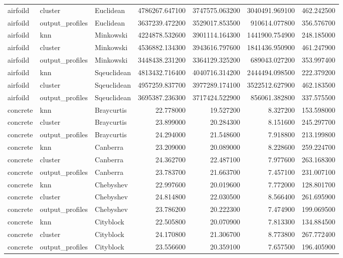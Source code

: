 \begin{tabular}{lllrrrr}
airfoild & cluster & Euclidean & 4786267.647100 & 3747575.063200 & 3040491.969100 & 462.242500 \\
airfoild & output\_profiles & Euclidean & 3637239.472200 & 3529017.853500 & 910614.077800 & 356.576700 \\
airfoild & knn & Minkowski & 4224878.532600 & 3901114.164300 & 1441900.754900 & 248.185000 \\
airfoild & cluster & Minkowski & 4536882.134300 & 3943616.797600 & 1841436.950900 & 461.247900 \\
airfoild & output\_profiles & Minkowski & 3448438.231200 & 3364129.325200 & 689043.027200 & 353.997400 \\
airfoild & knn & Sqeuclidean & 4813432.716400 & 4040716.314200 & 2444494.098500 & 222.379200 \\
airfoild & cluster & Sqeuclidean & 4957259.837700 & 3977289.174100 & 3522512.627900 & 462.183500 \\
airfoild & output\_profiles & Sqeuclidean & 3695387.236300 & 3717424.522900 & 856061.382800 & 337.575500 \\
concrete & knn & Braycurtis & 22.778000 & 19.527200 & 8.327200 & 153.598000 \\
concrete & cluster & Braycurtis & 23.899000 & 20.284300 & 8.151600 & 245.297700 \\
concrete & output\_profiles & Braycurtis & 24.294000 & 21.548600 & 7.918800 & 213.199800 \\
concrete & knn & Canberra & 23.209000 & 20.089000 & 8.228600 & 259.224700 \\
concrete & cluster & Canberra & 24.362700 & 22.487100 & 7.977600 & 263.168300 \\
concrete & output\_profiles & Canberra & 23.783700 & 21.663700 & 7.457100 & 231.007100 \\
concrete & knn & Chebyshev & 22.997600 & 20.019600 & 7.772000 & 128.801700 \\
concrete & cluster & Chebyshev & 24.814800 & 22.030500 & 8.566400 & 261.695900 \\
concrete & output\_profiles & Chebyshev & 23.786200 & 20.222300 & 7.474900 & 199.069500 \\
concrete & knn & Cityblock & 22.505800 & 20.070900 & 7.813300 & 134.884500 \\
concrete & cluster & Cityblock & 24.170800 & 21.306700 & 8.773800 & 267.772400 \\
concrete & output\_profiles & Cityblock & 23.556600 & 20.359100 & 7.657500 & 196.405900 \\

\end{tabular}
